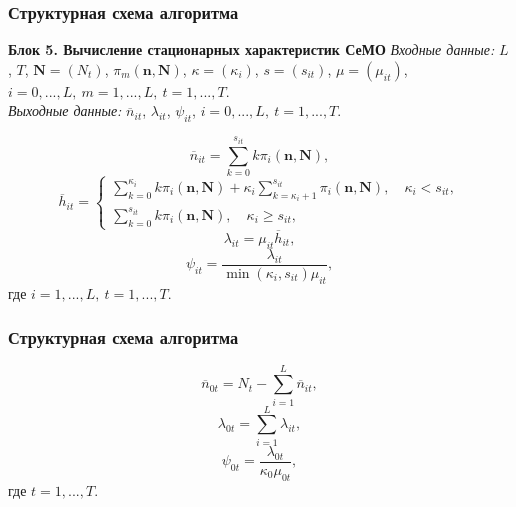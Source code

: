 \begin{frame} \frametitle{Структурная схема алгоритма}
\textbf{Блок 5. Вычисление стационарных характеристик СеМО}
\emph{Входные данные:} $L$, $T$, $\mathbf{N}=(N_t)$, $\pi_m(\mathbf{n},\mathbf{N})$, $\kappa=(\kappa_i)$, $s=(s_{it})$, $\mu=(\mu_{it})$, $i=0,...,L,~m=1,...,L,~t=1,...,T$.\\
\emph{Выходные данные:} $\overline{n}_{it}$, $\lambda_{it}$, $\psi_{it}$, $i=0,...,L,~t=1,...,T$.

\begin{equation}
\overline{n}_{it} = \sum\limits_{k=0}^{s_{it}} k \pi_i(\mathbf{n},\mathbf{N}),
 \label{eq:distribution_n}
\end{equation}
\begin{equation}
\overline{h}_{it} = \left\{
 \begin{array}{l}
 \sum\limits_{k=0}^{\kappa_i} k \pi_i(\mathbf{n},\mathbf{N}) + \kappa_i  \sum\limits_{k=\kappa_i + 1}^{s_{it}} \pi_i(\mathbf{n},\mathbf{N}), \quad \kappa_i < s_{it}, \\
 \sum\limits_{k=0}^{s_{it}} k \pi_i(\mathbf{n},\mathbf{N}), \quad \kappa_i \ge s_{it},
 \end{array}
\right.
 \label{eq:distribution_h}
\end{equation}
\begin{equation}
\lambda_{it} = \mu_{it} \overline{h}_{it},
 \label{eq:distribution_lambda}
\end{equation}
\begin{equation}
\psi_{it} = \frac{\lambda_{it}}{\min(\kappa_{i}, s_{it}) \mu_{it}},
 \label{eq:distribution_psi}
\end{equation}
где $i=1,...,L,~t=1,...,T$.
\end{frame}


\begin{frame} \frametitle{Структурная схема алгоритма}
\begin{equation}
\overline{n}_{0t} = N_t - \sum\limits_{i=1}^L \overline{n}_{it},
 \label{eq:distribution_n0}
\end{equation}
\begin{equation}
\lambda_{0t} = \sum\limits_{i=1}^L \lambda_{it},
 \label{eq:distribution_lambda0}
\end{equation}
\begin{equation}
\psi_{0t} = \frac{\lambda_{0t}}{\kappa_0 \mu_{0t}},
 \label{eq:distribution_psi0}
\end{equation}
где $t=1,...,T$.
\end{frame}

